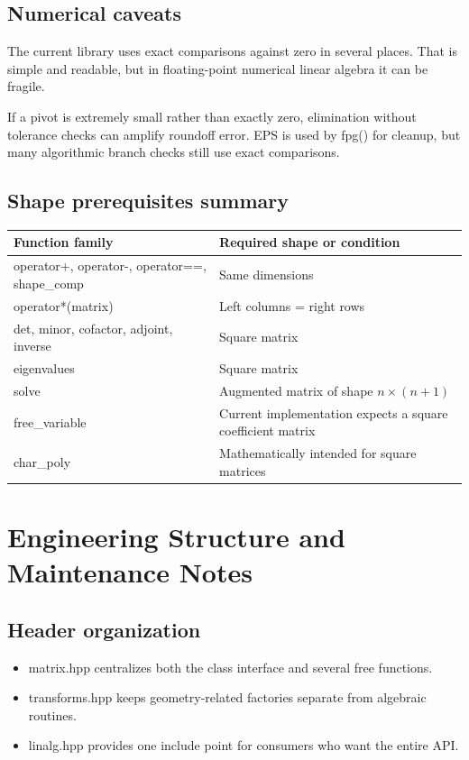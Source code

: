 \documentclass[11pt,a4paper,openany]{book}
\def\code#1{#1}%
\DeclareRobustCommand{\code}[1]{\texttt{\detokenize{#1}}}
\begin{document}
\section{Numerical caveats}
The current library uses exact comparisons against zero in several places. That is simple and readable, but in floating-point numerical linear algebra it can be fragile.

\begin{mathbox}
If a pivot is extremely small rather than exactly zero, elimination without tolerance checks can amplify roundoff error. \code{EPS} is used by \code{fpg()} for cleanup, but many algorithmic branch checks still use exact comparisons.
\end{mathbox}

\section{Shape prerequisites summary}
\begin{tabularx}{\linewidth}{@{}lX@{}}
\toprule
Function family & Required shape or condition \\
\midrule
\code{operator+}, \code{operator-}, \code{operator==}, \code{shape_comp} & Same dimensions \\
\code{operator*(matrix)} & Left columns = right rows \\
\code{det}, \code{minor}, \code{cofactor}, \code{adjoint}, \code{inverse} & Square matrix \\
\code{eigenvalues} & Square matrix \\
\code{solve} & Augmented matrix of shape \(n \times (n+1)\) \\
\code{free_variable} & Current implementation expects a square coefficient matrix \\
\code{char_poly} & Mathematically intended for square matrices \\
\bottomrule
\end{tabularx}

\chapter{Engineering Structure and Maintenance Notes}

\section{Header organization}
\begin{itemize}
    \item \code{matrix.hpp} centralizes both the class interface and several free functions.
    \item \code{transforms.hpp} keeps geometry-related factories separate from algebraic routines.
    \item \code{linalg.hpp} provides one include point for consumers who want the entire API.
\end{itemize}
\end{document}
